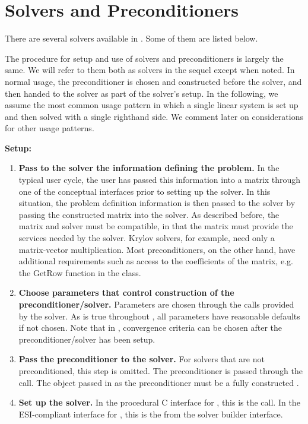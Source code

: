 \chapter{Solvers and Preconditioners}
\label{solvers}

There are several solvers available in \hypre{}.  Some of them are
listed below.

The procedure for setup and use of solvers and preconditioners is largely
the same. We will refer to them both as solvers in the sequel except when noted. 
In normal usage, 
the preconditioner is chosen and constructed before the solver,
and then handed to the solver as part of the solver's setup.
In the following, we assume the most common usage pattern in which
a single linear system is set up and then solved with a single righthand
side. We comment later on considerations for other usage patterns.

{\bf Setup:}

\begin{enumerate}

\item
{\bf Pass to the solver the information defining the problem.} In the
typical user cycle, the user has passed this information into a matrix
through one of the conceptual interfaces prior to setting up the
solver. In this situation, the problem definition information is then
passed to the solver by passing the constructed matrix into the
solver. As described before, the matrix and solver must be compatible,
in that the matrix must provide the services needed by the
solver. Krylov solvers, for example, need only a matrix-vector
multiplication.  Most preconditioners, on the other hand, have
additional requirements such as access to the coefficients of the
matrix, e.g. the GetRow function in the
 class.

\item
{\bf Choose parameters that control construction of the
preconditioner/solver.}  Parameters are chosen through the 
calls provided by the solver.  As is true throughout \hypre{}, all
parameters have reasonable defaults if not chosen.  Note that in
\hypre{}, convergence criteria can be chosen after the
preconditioner/solver has been setup.

\item
{\bf Pass the preconditioner to the solver.} For solvers that are not
preconditioned, this step is omitted. The preconditioner is passed
through the  call. The object passed in as the
preconditioner must be a fully constructed .

\item
{\bf Set up the solver.} In the procedural C interface for \hypre{},
this is the  call.  In the ESI-compliant interface for
\hypre{}, this is the  from the solver
builder interface.

\end{enumerate}

